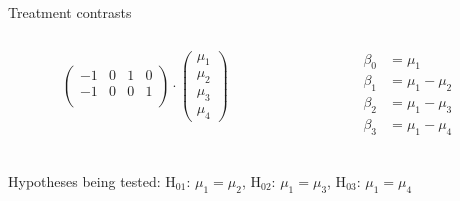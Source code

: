 \documentclass[aspectratio=169]{beamer}
\begin{document}
\begin{frame}{Treatment contrasts}
\begin{columns}
\begin{column}[t]{.5\textwidth}
\[\begin{pmatrix}
  -1 & 0 & 1 & 0 \\ 
  -1 & 0 & 0 & 1 \\ 
  \end{pmatrix} \cdot
  \begin{pmatrix}
    \mu_1 \\
    \mu_2 \\
    \mu_3 \\
    \mu_4
  \end{pmatrix}
\]
    \end{column}
    \begin{column}[t]{.5\textwidth}
\begin{align*}
  \beta_0 & = \mu_1 \\
  \beta_1 & = \mu_1 - \mu_2 \\
  \beta_2 & = \mu_1 - \mu_3 \\
  \beta_3 & = \mu_1 - \mu_4 \\
\end{align*}
    \end{column}
  \end{columns}
  \vspace{-.8cm}
Hypotheses being tested:
H$_{01}$: $\mu_1 = \mu_2$,
H$_{02}$: $\mu_1 = \mu_3$,
H$_{03}$: $\mu_1 = \mu_4$
\end{frame}
\end{document}
